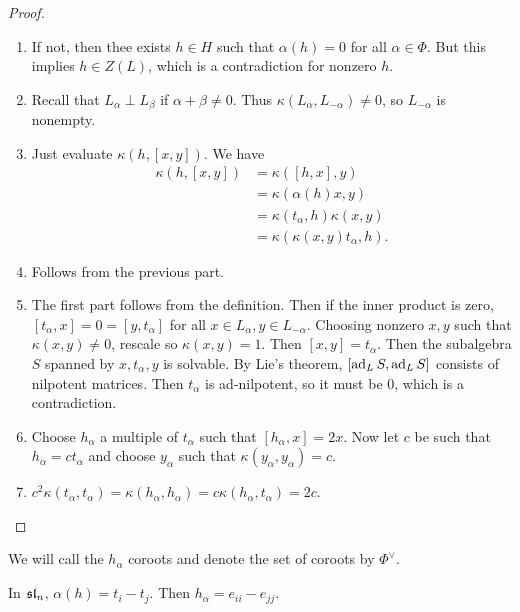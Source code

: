 \documentclass[twoside, 10pt]{article}
\begin{document}
    \begin{proof}
        \begin{enumerate}
            \item If not, then thee exists $h \in H$ such that $\alpha(h) = 0$ for all $\alpha \in \Phi$. But this implies $h \in Z(L)$, which is a contradiction for nonzero $h$.
            \item Recall that $L_{\alpha} \perp L_{\beta}$ if $\alpha + \beta \neq 0$. Thus $\kappa(L_{\alpha}, L_{-\alpha}) \neq 0$, so $L_{-\alpha}$ is nonempty.
            \item Just evaluate $\kappa(h,[x,y])$. We have
                \begin{align*}
                    \kappa(h,[x,y]) &= \kappa([h,x],y) \\
                                    &= \kappa(\alpha(h)x,y) \\
                                    &= \kappa(t_{\alpha},h) \kappa(x,y) \\
                                    &= \kappa(\kappa(x,y)t_{\alpha},h).
                \end{align*}
            \item Follows from the previous part.
            \item The first part follows from the definition. Then if the inner product is zero, $[t_{\alpha},x] = 0 = [y,t_{\alpha}]$ for all $x \in L_{\alpha}, y \in L_{-\alpha}$. Choosing nonzero $x,y$ such that $\kappa(x,y) \neq 0$, rescale so $\kappa(x,y) = 1$. Then $[x,y] = t_{\alpha}$. Then the subalgebra $S$ spanned by $x,t_{\alpha},y$ is solvable. By Lie's theorem, $[\operatorname{ad}_L S, \operatorname{ad}_L S]$ consists of nilpotent matrices. Then $t_{\alpha}$ is ad-nilpotent, so it must be $0$, which is a contradiction.
            \item Choose $h_{\alpha}$ a multiple of $t_{\alpha}$ such that $[h_{\alpha},x] = 2x$. Now let $c$ be such that $h_{\alpha} = ct_{\alpha}$ and choose $y_{\alpha}$ such that $\kappa(y_{\alpha},y_{\alpha}) = c$. 
            \item $c^2\kappa(t_{\alpha},t_{\alpha}) = \kappa(h_{\alpha},h_{\alpha}) = c \kappa(h_{\alpha},t_{\alpha}) = 2c$.
        \end{enumerate}
    \end{proof}

    We will call the $h_{\alpha}$ coroots and denote the set of coroots by $\Phi^{\vee}$.

    \begin{exm}
        In $\mathfrak{sl}_n$, $\alpha(h) = t_i - t_j$. Then $h_{\alpha} = e_{ii} - e_{jj}$.
    \end{exm}
\end{document}
